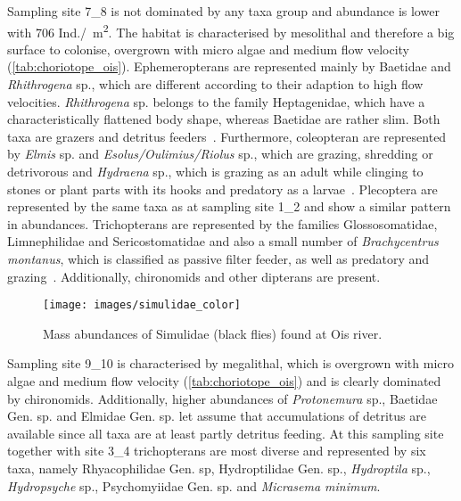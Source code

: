 Sampling site 7\_8 is not dominated by any taxa group and abundance is lower with 706 Ind./\SI{}{\square\meter}. The habitat is characterised by mesolithal and therefore a big surface to colonise, overgrown with micro algae and medium flow velocity (\cref{tab:choriotope_ois}). Ephemeropterans are represented mainly by Baetidae and \emph{Rhithrogena} sp., which are different according to their adaption to high flow velocities. \emph{Rhithrogena} sp. belongs to the family Heptagenidae, which have a characteristically flattened body shape, whereas Baetidae are rather slim. Both taxa are grazers and detritus feeders~\parencite{Bauernfeind2002}. Furthermore, coleopteran are represented by \emph{Elmis} sp. and \emph{Esolus/Oulimius/Riolus} sp., which are grazing, shredding or detrivorous and \emph{Hydraena} sp., which is grazing as an adult while clinging to stones or plant parts with its hooks and predatory as a larvae~. Plecoptera are represented by the same taxa as at sampling site 1\_2 and show a similar pattern in abundances. Trichopterans are represented by the families Glossosomatidae, Limnephilidae and Sericostomatidae and also a small number of \emph{Brachycentrus montanus}, which is classified as passive filter feeder, as well as predatory and grazing~. Additionally, chironomids and other dipterans are present.



\begin{figure}[!htb]                            %
  \center
  \texttt{[image: images/simulidae\_color]}              %
  \caption{Mass abundances of Simulidae (black flies) found at Ois river.}            %
  \label{fig:simulidae}                                                        %
\end{figure}

Sampling site 9\_10 is characterised by megalithal, which is overgrown with micro algae and medium flow velocity (\cref{tab:choriotope_ois}) and is clearly dominated by chironomids. Additionally, higher abundances of \emph{Protonemura} sp., Baetidae Gen. sp. and Elmidae Gen. sp. let assume that accumulations of detritus are available since all taxa are at least partly detritus feeding. At this sampling site together with site 3\_4 trichopterans are most diverse and represented by six taxa, namely Rhyacophilidae Gen. sp, Hydroptilidae Gen. sp., \emph{Hydroptila} sp., \emph{Hydropsyche} sp., Psychomyiidae Gen. sp. and \emph{Micrasema minimum}.

